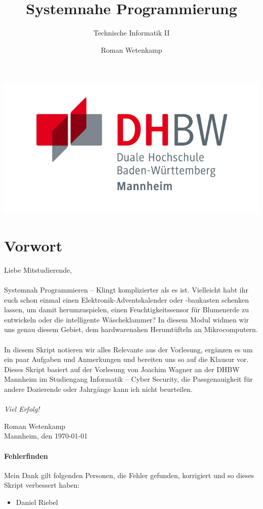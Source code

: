 \documentclass[11pt,a4paper]{scrartcl}
\author{Roman Wetenkamp}
\title{Systemnahe Programmierung}
\subtitle{Technische Informatik II}
\begin{document}
\vspace{3cm}
\maketitle
\begin{center}
\includegraphics[scale=0.7]{DHBW.jpg}
\end{center}
\pagebreak
\tableofcontents
\pagebreak
\section*{Vorwort}
Liebe Mitstudierende, \\\\
Systemnah Programmieren -- Klingt komplizierter als es ist. Vielleicht habt ihr euch schon einmal einen Elektronik-Adventskalender oder -baukasten schenken lassen, um damit herumzuspielen, einen Feuchtigkeitssensor für Blumenerde zu entwickeln oder die intelligente Wäscheklammer? In diesem Modul widmen wir uns genau diesem Gebiet, dem hardwarenahen Herumtüfteln an Mikrocomputern. \\\\
In diesem Skript notieren wir alles Relevante aus der Vorlesung, ergänzen es um ein paar Aufgaben und Anmerkungen und bereiten uns so auf die Klausur vor. Dieses Skript basiert auf der Vorlesung von Joachim Wagner an der DHBW Mannheim im Studiengang Informatik -- Cyber Security, die Passgenauigkeit für andere Dozierende oder Jahrgänge kann ich nicht beurteilen. \\\\
\textit{Viel Erfolg!}  \\
\begin{flushright}
Roman Wetenkamp \\
Mannheim, den \today
\end{flushright}  
\vfill
\paragraph{Fehlerfinden}
Mein Dank gilt folgenden Personen, die Fehler gefunden, korrigiert und so dieses Skript verbessert haben: 
\begin{itemize}
\item Daniel Riebel
\end{itemize}
\end{document}
